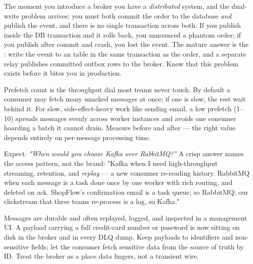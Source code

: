\begin{seniornote}
The moment you introduce a broker you have a \emph{distributed} system, and the dual-write problem arrives: you must both commit the order to the database \emph{and} publish the event, and there is no single transaction across both. If you publish inside the DB transaction and it rolls back, you announced a phantom order; if you publish after commit and crash, you lost the event. The mature answer is the : write the event to an  table in the same transaction as the order, and a separate relay publishes committed outbox rows to the broker. Know that this problem exists before it bites you in production.
\end{seniornote}

\begin{perfnote}
Prefetch count is the throughput dial most teams never touch. By default a consumer may fetch many unacked messages at once; if one is slow, the rest wait behind it. For slow, side-effect-heavy work like sending email, a low prefetch (1--10) spreads messages evenly across worker instances and avoids one consumer hoarding a batch it cannot drain. Measure before and after --- the right value depends entirely on per-message processing time.
\end{perfnote}

\begin{interview}
Expect: \emph{"When would you choose Kafka over RabbitMQ?"} A crisp answer names the access pattern, not the brand: "Kafka when I need high-throughput streaming, retention, and \emph{replay} --- a new consumer re-reading history. RabbitMQ when each message is a task done once by one worker with rich routing, and deleted on ack. ShopFlow's confirmation email is a task queue, so RabbitMQ; our clickstream that three teams re-process is a log, so Kafka."
\end{interview}

\begin{secwarn}
Messages are durable and often replayed, logged, and inspected in a management UI. A payload carrying a full credit-card number or password is now sitting on disk in the broker and in every DLQ dump. Keep payloads to identifiers and non-sensitive fields; let the consumer fetch sensitive data from the source of truth by ID. Treat the broker as a place data lingers, not a transient wire.
\end{secwarn}

